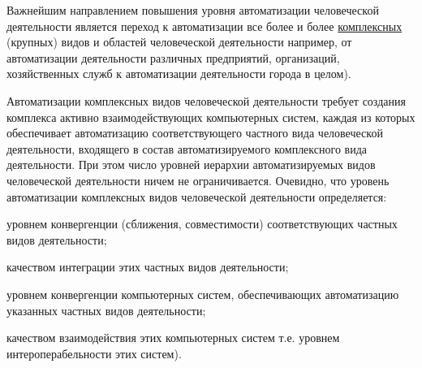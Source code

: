 Важнейшим направлением повышения уровня автоматизации человеческой деятельности является переход к автоматизации все более и более \underline{комплексных} (крупных) видов и областей человеческой деятельности например, от автоматизации деятельности различных предприятий, организаций, хозяйственных служб к автоматизации деятельности города в целом).

Автоматизации комплексных видов человеческой деятельности требует создания комплекса активно взаимодействующих компьютерных систем, каждая из которых обеспечивает автоматизацию соответствующего частного вида человеческой деятельности, входящего в состав автоматизируемого комплексного вида деятельности. При этом число уровней иерархии автоматизируемых видов человеческой деятельности ничем не ограничивается. Очевидно, что уровень автоматизации комплексных видов человеческой деятельности определяется:

\begin{textitemize}
	\item
	уровнем конвергенции (сближения, совместимости) соответствующих частных видов деятельности;
	\item
	качеством интеграции этих частных видов деятельности;
	\item
	уровнем конвергенции компьютерных систем, обеспечивающих автоматизацию указанных частных видов деятельности;
	\item
	качеством взаимодействия этих компьютерных систем т.е. уровнем интероперабельности этих систем).
\end{textitemize}

